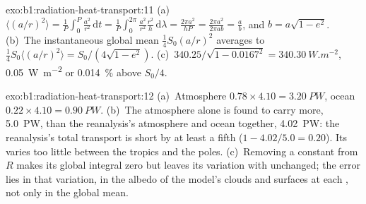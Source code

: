 \begin{solution}{exo:b1:radiation-heat-transport:11}
(a)~$\langle (a/r)^2\rangle = \frac1P\int_0^P \frac{a^2}{r^2}\,\mathrm dt =
\frac1P\int_0^{2\pi}\frac{a^2}{r^2}\frac{r^2}{h}\,\mathrm d\lambda = \frac{2\pi
a^2}{hP} = \frac{2\pi a^2}{2\pi a b} = \frac ab$, and $b = a\sqrt{1-e^2}$.
(b)~The instantaneous global mean $\frac14 S_0(a/r)^2$ averages to $\frac14 S_0
\langle(a/r)^2\rangle = S_0/(4\sqrt{1-e^2})$. (c)~$340.25/\sqrt{1 - 0.0167^2} =
\qty{340.30}{W.m^{-2}}$, \qty{0.05}{W.m^{-2}} or \qty{0.014}{\percent} above
$S_0/4$.
\end{solution}

\begin{solution}{exo:b1:radiation-heat-transport:12}
(a)~Atmosphere $0.78 \times 4.10 = \qty{3.20}{PW}$, ocean $0.22 \times 4.10 =
\qty{0.90}{PW}$. (b)~The atmosphere alone is found to carry more, \qty{5.0}{PW},
than the reanalysis's atmosphere and ocean together, \qty{4.02}{PW}: the
reanalysis's total transport is short by at least a fifth ($1 - 4.02/5.0 = 0.20$).
Its  varies too little between the tropics and the poles. (c)~Removing a
constant from $R$ makes its global integral zero but leaves its variation with
 unchanged; the error lies in that variation, in the albedo of the model's
clouds and surfaces at each , not only in the global mean.
\end{solution}

